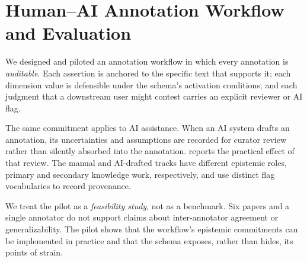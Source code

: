 
\section{Human--AI Annotation Workflow and Evaluation}
\label{sec:workflow}

We designed and piloted an annotation workflow in which every annotation is
\emph{auditable}. Each assertion is anchored to the specific text that
supports it; each dimension value is defensible under the schema's
activation conditions; and each judgment that a downstream user might
contest carries an explicit reviewer or AI flag.

The same commitment applies to AI assistance. When an AI system drafts an
annotation, its uncertainties and assumptions are recorded for curator
review rather than silently absorbed into the annotation.
 reports the practical effect of that review. The
manual and AI-drafted tracks have different epistemic roles, primary and
secondary knowledge work, respectively, and use distinct flag vocabularies
to record provenance.

We treat the pilot as a \emph{feasibility study}, not as a benchmark.
Six papers and a single annotator do not support claims about
inter-annotator agreement or generalizability. The pilot shows that the
workflow's epistemic commitments can be implemented in practice and that
the schema exposes, rather than hides, its points of strain.

